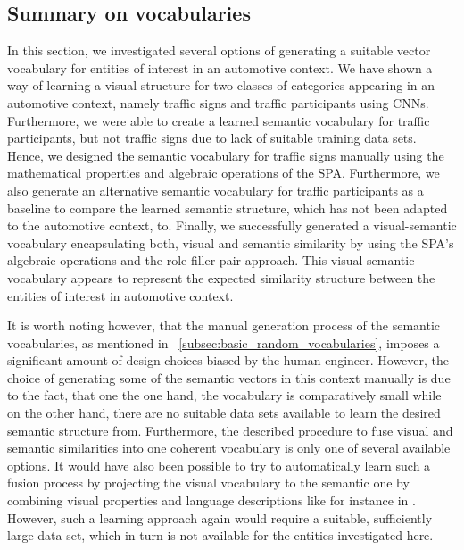 \subsection{Summary on vocabularies}%
\label{subsec:summary_on_vocabularies}

In this section, we investigated several options of generating a suitable vector vocabulary for entities of interest in an automotive context.
We have shown a way of learning a visual structure for two classes of categories appearing in an automotive context, namely traffic signs and traffic participants using \acp{CNN}.
Furthermore, we were able to create a learned semantic vocabulary for traffic participants, but not traffic signs due to lack of suitable training data sets.
Hence, we designed the semantic vocabulary for traffic signs manually using the mathematical properties and algebraic operations of the \ac{SPA}.
Furthermore, we also generate an alternative semantic vocabulary for traffic participants as a baseline to compare the learned semantic structure, which has not been adapted to the automotive context, to.
Finally, we successfully generated a visual-semantic vocabulary encapsulating both, visual and semantic similarity by using the \ac{SPA}'s algebraic operations and the role-filler-pair approach.
This visual-semantic vocabulary appears to represent the expected similarity structure between the entities of interest in automotive context.

It is worth noting however, that the manual generation process of the semantic vocabularies, as mentioned in ~\ref{subsec:basic_random_vocabularies}, imposes a significant amount of design choices biased by the human engineer.
However, the choice of generating some of the semantic vectors in this context manually is due to the fact, that one the one hand, the vocabulary is comparatively small while on the other hand, there are no suitable data sets available to learn the desired semantic structure from.
Furthermore, the described procedure to fuse visual and semantic similarities into one coherent vocabulary is only one of several available options.
It would have also been possible to try to automatically learn such a fusion process by projecting the visual vocabulary to the semantic one by combining visual properties and language descriptions like for instance in \cite{Karpathy2017}.
However, such a learning approach again would require a suitable, sufficiently large data set, which in turn is not available for the entities investigated here.

